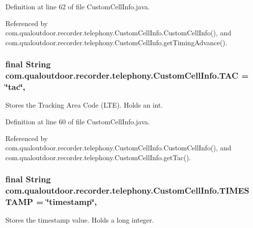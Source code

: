 Definition at line 62 of file Custom\-Cell\-Info.\-java.



Referenced by com.\-qualoutdoor.\-recorder.\-telephony.\-Custom\-Cell\-Info.\-Custom\-Cell\-Info(), and com.\-qualoutdoor.\-recorder.\-telephony.\-Custom\-Cell\-Info.\-get\-Timing\-Advance().

\hypertarget{classcom_1_1qualoutdoor_1_1recorder_1_1telephony_1_1CustomCellInfo_a67566ea7b47531de3a99e6aea5225212}{
\subsubsection[{T\-A\-C}]{\setlength{\rightskip}{0pt plus 5cm}final String com.\-qualoutdoor.\-recorder.\-telephony.\-Custom\-Cell\-Info.\-T\-A\-C = \char`\"{}tac\char`\"{}\hspace{0.3cm}{\ttfamily [static]}, {\ttfamily [private]}}}\label{classcom_1_1qualoutdoor_1_1recorder_1_1telephony_1_1CustomCellInfo_a67566ea7b47531de3a99e6aea5225212}
Stores the Tracking Area Code (L\-T\-E). Holds an int. 

Definition at line 60 of file Custom\-Cell\-Info.\-java.



Referenced by com.\-qualoutdoor.\-recorder.\-telephony.\-Custom\-Cell\-Info.\-Custom\-Cell\-Info(), and com.\-qualoutdoor.\-recorder.\-telephony.\-Custom\-Cell\-Info.\-get\-Tac().

\hypertarget{classcom_1_1qualoutdoor_1_1recorder_1_1telephony_1_1CustomCellInfo_a33a6ffe22bfac0d38f9735ff411f8f12}{
\subsubsection[{T\-I\-M\-E\-S\-T\-A\-M\-P}]{\setlength{\rightskip}{0pt plus 5cm}final String com.\-qualoutdoor.\-recorder.\-telephony.\-Custom\-Cell\-Info.\-T\-I\-M\-E\-S\-T\-A\-M\-P = \char`\"{}timestamp\char`\"{}\hspace{0.3cm}{\ttfamily [static]}, {\ttfamily [private]}}}\label{classcom_1_1qualoutdoor_1_1recorder_1_1telephony_1_1CustomCellInfo_a33a6ffe22bfac0d38f9735ff411f8f12}
Stores the timestamp value. Holds a long integer. 


